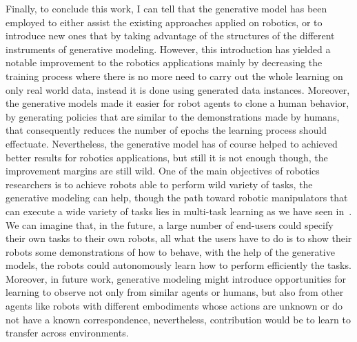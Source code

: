 Finally, to conclude this work, I can tell that the generative model has been employed to either assist the existing approaches applied on robotics, or to introduce new ones that by taking advantage of the structures of the different instruments of generative modeling. However, this introduction has yielded a notable improvement to the robotics applications mainly by decreasing the training process where there is no more need to carry out the whole learning on only real world data, instead it is done using generated data instances. Moreover, the generative models made it easier for robot agents to clone a human behavior, by generating policies that are similar to the demonstrations made by humans, that consequently reduces the number of epochs the learning process should effectuate. Nevertheless, the generative model has of course helped to achieved better results for robotics applications, but still it is not enough though, the improvement margins are still wild. One of the main objectives of robotics researchers is to achieve robots able to perform wild variety of tasks, the generative modeling can help, though the path toward robotic manipulators that can execute a wide variety of tasks lies in multi-task learning as we have seen in~\cite{rahmatizadeh2018vision}. We can imagine that, in the future, a large number of end-users could specify their own tasks to their own robots, all what the users have to do is to show their robots some demonstrations of how to behave, with the help of the generative models, the robots could autonomously learn how to perform efficiently the tasks. Moreover, in future work, generative modeling might introduce opportunities for learning to observe not only from similar agents or humans, but also from other agents like robots with different embodiments whose actions are unknown or do not have a known correspondence, nevertheless, contribution would be to learn to transfer across environments.
\clearpage{\pagestyle{empty}\cleardoublepage}